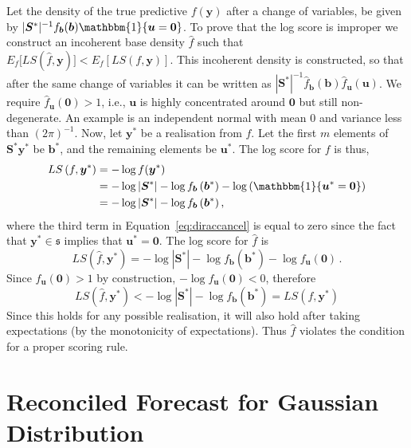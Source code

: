 \documentclass[a4paper,12pt]{article}
\theoremstyle{definition}
\begin{document}
Let the density of the true predictive $f(\bm{y})$ after a change of variables, be given by $|\bm{S}^*|^{-1}f_{\bm{b}}(\bm{b})\mathbbm{1}\{\bm{u}=\bm{0}\}$. To prove that the log score is improper we construct an incoherent base density $\hat{f}$ such that $E_f\big[LS(\hat{f},\bm{y})\big]<E_f\left[LS\left(f,\bm{y}\right)\right]$. This incoherent density is constructed, so that after the same change of variables it can be written as $|\bm{S}^*|^{-1}\hat{f}_{\bm{b}}(\bm{b})\hat{f}_{\bm{u}}(\bm{u})$. We require $\hat{f}_{\bm{u}}(\bm{0})>1$, i.e., $\bm{u}$ is highly concentrated around $\bm{0}$ but still non-degenerate. An example is an independent normal with mean 0 and variance less than $(2\pi)^{-1}$. Now, let $\bm{y}^*$ be a realisation from $f$. Let the first $m$ elements of $\bm{S}^*\bm{y}^*$ be $\bm{b}^*$, and the remaining elements be $\bm{u}^*$. The log score for $f$ is thus,
\begin{align}
LS\left(f,\bm{y}^*\right) &= -\log f(\bm{y}^*) \nonumber\\
&=-\log|\bm{S}^*|-\log f_{\bm{b}}\left(\bm{b}^*\right)-\log\left(\mathbbm{1}\{\bm{u}^*=\bm{0}\}\right)\label{eq:diraccancel}\\
&=-\log|\bm{S}^*|-\log f_{\bm{b}}\left(\bm{b}^*\right),\nonumber
\end{align}
where the third term in Equation~\eqref{eq:diraccancel} is equal to zero since the fact that $\bm{y}^*\in\mathfrak{s}$ implies that $\bm{u}^*=\bm{0}$. The log score for $\hat{f}$ is
\[
LS(\hat{f},\bm{y}^*) = -\log|\bm{S}^*|-\log f_{\bm{b}}(\bm{b}^*)- \log f_{\bm{u}}(\bm{0})\,.
\]
Since $f_{\bm{u}}(\bm{0})>1$ by construction, $-\log f_{\bm{u}}(\bm{0})<0$, therefore
\[
LS(\hat{f},\bm{y}^*) <-\log|\bm{S}^*|-\log f_{\bm{b}}(\bm{b}^*)=LS\left(f,\bm{y}^*\right)
\]
Since this holds for any possible realisation, it will also hold after taking expectations (by the monotonicity of expectations). Thus $\hat{f}$ violates the condition for a proper scoring rule.

\section{Reconciled Forecast for Gaussian Distribution}\label{app:gauss_ex}
\end{document}
